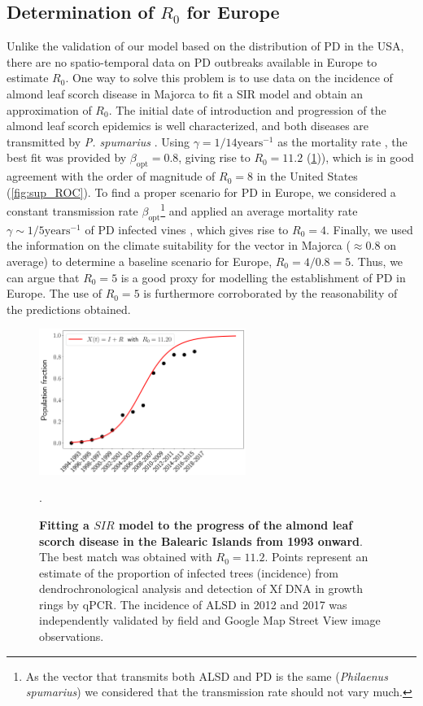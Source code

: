 \subsection{Determination of $R_0$ for Europe}\label{app:R0_Europe}

Unlike the validation of our model based on the distribution of PD in the
USA, there are no spatio-temporal data on PD outbreaks available in Europe to
estimate $R_0$. One way to solve this problem is to use data on the incidence
of almond leaf scorch disease in Majorca to fit a SIR model and obtain an
approximation of $R_0$. The initial date of introduction and progression of the
almond leaf scorch epidemics is well characterized, and both diseases are
transmitted by \textit{P. spumarius} \cite{Moralejo2019,Moralejo2020}. Using
$\gamma=1/14 \textrm{years}^{-1}$ as the mortality rate \cite{Moralejo2020},
the best fit was provided by $\beta_{\textrm{opt}}=0.8$, giving rise to
$R_0=11.2$ (\cref{fig:sup_R0_Europe})), which is in good agreement with the
order of magnitude of $R_0=8$
in the United States (\cref{fig:sup_ROC}). To find a proper scenario for PD in
Europe, we considered a constant transmission rate
$\beta_{\textrm{opt}}$\footnote{As the vector that transmits both ALSD and PD
    is the same (\textit{Philaenus spumarius}) we considered that the
    transmission
    rate should not vary much.} and applied an average mortality rate
$\gamma\sim
    1/5 \textrm{years}^{-1}$ of PD infected vines \cite{Purcell2013}, which
gives
rise to $R_0=4$. Finally, we used the information on the climate suitability
for the vector in Majorca ($\approx0.8$ on average) to determine a baseline
scenario for Europe, $R_0=4/0.8=5$. Thus, we can argue that $R_0=5$ is a good
proxy for modelling the establishment of PD in Europe. The use of $R_0=5$ is
furthermore corroborated by the reasonability of the predictions obtained.

\begin{figure}[H]
    \centering
    \includegraphics[width=0.6\textwidth]{Figures/R0_xylella.png}
    \caption[Fit of an SIR model to ALSD data]{\textbf{Fitting a $SIR$ model to
            the progress of the almond
            leaf scorch disease in the Balearic Islands from 1993 onward}. The
        best match
        was obtained with $R_0= 11.2$. Points represent an estimate of the
        proportion
        of infected trees (incidence) from dendrochronological analysis and
        detection
        of Xf DNA in growth rings by qPCR. The incidence of ALSD in 2012 and
        2017 was
        independently validated by field and Google Map Street View image
        observations.}.
    \label{fig:sup_R0_Europe} %
\end{figure}

